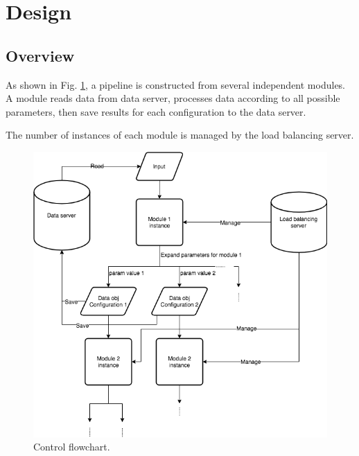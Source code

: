\documentclass{article}
\begin{document}
\section{Design}

    \subsection{Overview}

    As shown in Fig. \ref{fig:control_flow},
    a pipeline is constructed from several independent modules.
    A module reads data from data server,
    processes data according to all possible parameters,
    then save results for each configuration to the data server.

    The number of instances of each module is managed by the load balancing server.

    \begin{figure}[h]
        \begin{center}
            \includegraphics[width=\textwidth]{fig/control_flow.png}
        \end{center}
        \label{fig:control_flow}
        \caption{Control flowchart.}
    \end{figure}
\end{document}
